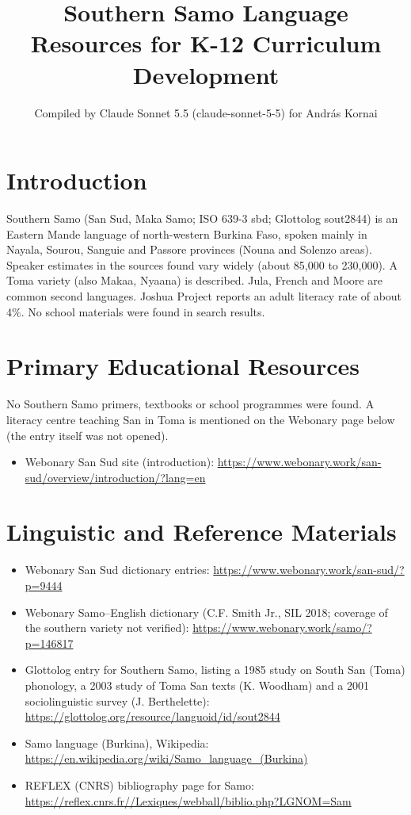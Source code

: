 \documentclass[12pt]{article}
\title{Southern Samo Language Resources for K-12 Curriculum Development}
\author{Compiled by Claude Sonnet 5.5 (claude-sonnet-5-5) for Andr\'as Kornai}
\date{}
\begin{document}
\maketitle

\section{Introduction}
Southern Samo (San Sud, Maka Samo; ISO 639-3 sbd; Glottolog sout2844) is an Eastern Mande language of north-western Burkina Faso, spoken mainly in Nayala, Sourou, Sanguie and Passore provinces (Nouna and Solenzo areas). Speaker estimates in the sources found vary widely (about 85,000 to 230,000). A Toma variety (also Makaa, Nyaana) is described. Jula, French and Moore are common second languages. Joshua Project reports an adult literacy rate of about 4\%. No school materials were found in search results.

\section{Primary Educational Resources}
No Southern Samo primers, textbooks or school programmes were found. A literacy centre teaching San in Toma is mentioned on the Webonary page below (the entry itself was not opened).
\begin{itemize}
\item Webonary San Sud site (introduction): \url{https://www.webonary.work/san-sud/overview/introduction/?lang=en}
\end{itemize}

\section{Linguistic and Reference Materials}
\begin{itemize}
\item Webonary San Sud dictionary entries: \url{https://www.webonary.work/san-sud/?p=9444}
\item Webonary Samo--English dictionary (C.F. Smith Jr., SIL 2018; coverage of the southern variety not verified): \url{https://www.webonary.work/samo/?p=146817}
\item Glottolog entry for Southern Samo, listing a 1985 study on South San (Toma) phonology, a 2003 study of Toma San texts (K. Woodham) and a 2001 sociolinguistic survey (J. Berthelette): \url{https://glottolog.org/resource/languoid/id/sout2844}
\item Samo language (Burkina), Wikipedia: \url{https://en.wikipedia.org/wiki/Samo_language_(Burkina)}
\item REFLEX (CNRS) bibliography page for Samo: \url{https://reflex.cnrs.fr//Lexiques/webball/biblio.php?LGNOM=Sam}
\end{itemize}
\end{document}
